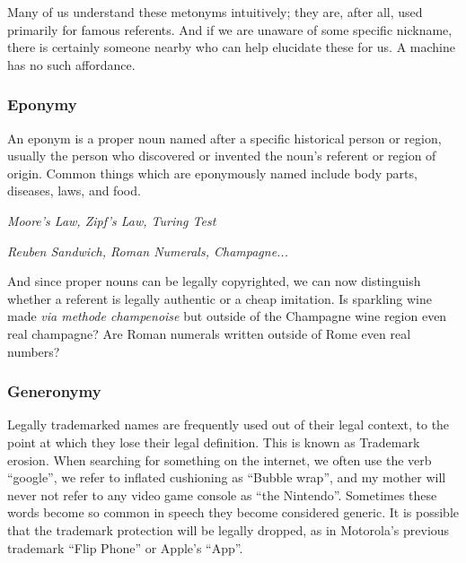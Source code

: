 Many of us understand these metonyms intuitively; they are, after all, used primarily for famous referents. And if we are unaware of some specific nickname, there is certainly someone nearby who can help elucidate these for us. A machine has no such affordance.


\subsubsection{Eponymy}
An eponym is a proper noun named after a specific historical person or region, usually the person who discovered or invented the noun's referent or region of origin. Common things which are eponymously named include body parts, diseases, laws, and food.

\begin{center}
    \textit{Moore's Law, Zipf's Law, Turing Test}
    
    \textit{Reuben Sandwich, Roman Numerals, Champagne...}
\end{center}

And since proper nouns can be legally copyrighted, we can now distinguish whether a referent is legally authentic or a cheap imitation. Is sparkling wine made \textit{via methode champenoise} but outside of the Champagne wine region even real champagne? Are Roman numerals written outside of Rome even real numbers? 

\subsubsection{Generonymy}
Legally trademarked names are frequently used out of their legal context, to the point at which they lose their legal definition. This is known as Trademark erosion. When searching for something on the internet, we often use the verb ``google'', we refer to inflated cushioning as ``Bubble wrap'', and my mother will never not refer to any video game console as ``the Nintendo''. Sometimes these words become so common in speech they become considered generic. It is possible that the trademark protection will be legally dropped, as in Motorola's previous trademark ``Flip Phone'' or Apple's ``App''.


